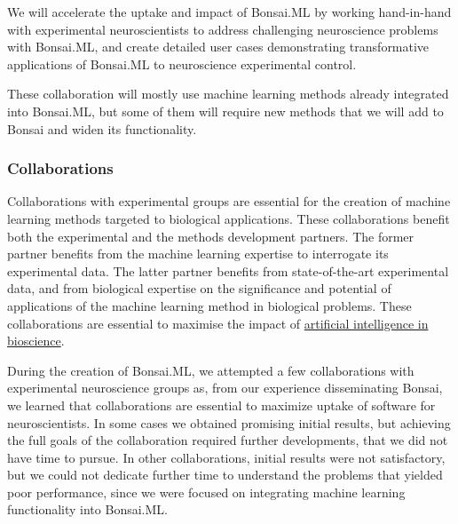 
We will accelerate the uptake and impact of Bonsai.ML by
working hand-in-hand with experimental neuroscientists to address
challenging neuroscience problems with Bonsai.ML, and create detailed user
cases demonstrating
transformative applications of Bonsai.ML to neuroscience experimental control.
%

These collaboration will mostly use machine learning methods already integrated
into Bonsai.ML, but some of them will require new methods that we will add to
Bonsai and widen its functionality.

\subsubsection{Collaborations}

Collaborations with experimental groups are essential for the creation of
machine learning methods targeted to biological applications. These
collaborations benefit both the experimental and the methods development
partners.
%
The former partner benefits from the machine learning expertise to interrogate its experimental data.
%
The latter partner benefits from state-of-the-art experimental
data, and from biological expertise on the significance and potential of applications of
the machine learning method in biological problems.
%
These collaborations are essential to maximise the impact of
\href{https://www.ukri.org/what-we-do/browse-our-areas-of-investment-and-support/artificial-intelligence-in-bioscience/}{artificial
intelligence in bioscience}.

During the creation of Bonsai.ML, we attempted a few collaborations with
experimental neuroscience groups as, from our experience disseminating Bonsai,
we learned that collaborations are essential to maximize uptake of software for
neuroscientists.
%
In some cases we obtained promising initial results, but achieving the full
goals of the collaboration required further developments, that we did not have
time to pursue.
%
In other collaborations, initial results were not satisfactory, but we could
not dedicate further time to understand the problems that yielded poor
performance, since we were focused on integrating machine learning
functionality into Bonsai.ML.


